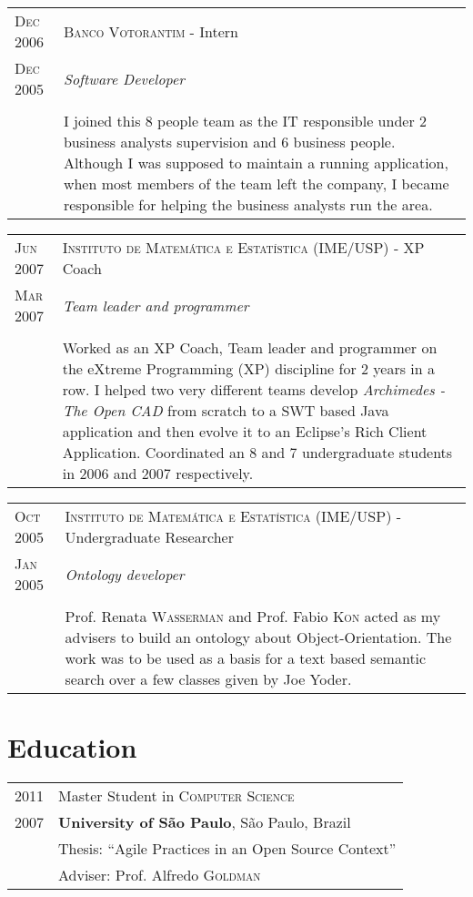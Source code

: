 \documentclass[letter,10pt]{article}
\begin{document}
\begin{tabular}{p{2.5cm}|p{13.5cm}}
  \textsc{Dec 2006} & \textsc{Banco Votorantim} - Intern\\
  \textsc{Dec 2005} &\emph{Software Developer}\\
  &\\
  &I joined this 8 people team as the IT responsible
  under 2 business analysts supervision and 6 business
  people. Although I was supposed to maintain a
  running application, when most members of the team left the company,
  I became responsible for helping the business analysts run the
  area.
\end{tabular}

\begin{tabular}{p{2.5cm}|p{13.5cm}}
  \textsc{Jun 2007} & \textsc{Instituto de Matemática e Estatística
    (IME/USP)} - XP Coach\\
  \textsc{Mar 2007}& \emph{Team leader and programmer}\\
  &\\
  &  Worked as an XP Coach, Team leader and programmer on the eXtreme
  Programming (XP) discipline for
  2 years in a row. I helped two very different teams develop
  \emph{Archimedes - The Open CAD} from scratch to a SWT based Java
  application and then evolve it to an Eclipse's Rich Client
  Application. Coordinated an 8 and 7 undergraduate students in
  2006 and 2007 respectively.
\end{tabular}

\begin{tabular}{p{2.5cm}|p{13.5cm}}
  \textsc{Oct 2005} & \textsc{Instituto de Matemática e Estatística
    (IME/USP)} - Undergraduate Researcher\\
  \textsc{Jan 2005}& \emph{Ontology developer}\\
  &\\
  & Prof. Renata \textsc{Wasserman} and Prof. Fabio \textsc{Kon} acted as my
  advisers to build an ontology about Object-Orientation. The work
  was to be used as a basis for a text based semantic search over a
  few classes given by Joe Yoder.
\end{tabular}

\section{Education}
\begin{tabular}{p{2.5cm}l}
  \textsc{2011} & Master Student in \textsc{Computer Science}\\
  \textsc{2007} & \textbf{University of São Paulo}, São Paulo, Brazil\\
  & Thesis: ``Agile Practices in an Open Source Context''\\
  & \small Adviser: Prof. Alfredo \textsc{Goldman}\\
\end{tabular}
\end{document}
